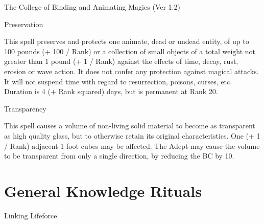 \begin{Chapter}{The College of Binding and Animating Magics (Ver 1.2)}
\begin{spell}[G-9]{Preservation }


\begin{effects}
This spell preserves and protects one animate, dead or undead entity,
of up to 100 pounds (+ 100 / Rank) or a collection of small objects of
a total weight not greater than 1 pound (+ 1 / Rank) against the
effects of time, decay, rust, erosion or wave action.  It does not
confer any protection against magical attacks.  It will not suspend
time with regard to resurrection, poisons, curses, etc.  Duration is 4
(+ Rank squared) days, but is permanent at Rank 20.
\end{effects}
\end{spell}

\begin{spell}[G-10]{Transparency }

\begin{effects}
This spell causes a volume of non-living solid material to become as
transparent as high quality glass, but to otherwise retain its
original characteristics.  One (+ 1 / Rank) adjacent 1 foot cubes may
be affected.  The Adept may cause the volume to be transparent from
only a single direction, by reducing the BC by 10.
\end{effects}
\end{spell}


\section{General Knowledge Rituals}

\begin{ritual}[Q-1]{Linking Lifeforce }


\end{ritual}
\end{Chapter}
